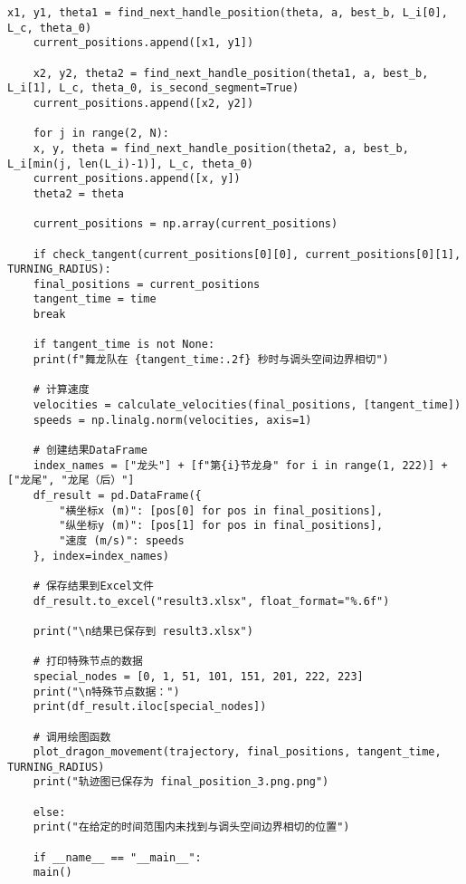 \begin{lstlisting}[caption={问题三处理代码1}]
	x1, y1, theta1 = find_next_handle_position(theta, a, best_b, L_i[0], L_c, theta_0)
	current_positions.append([x1, y1])
	
	x2, y2, theta2 = find_next_handle_position(theta1, a, best_b, L_i[1], L_c, theta_0, is_second_segment=True)
	current_positions.append([x2, y2])
	
	for j in range(2, N):
	x, y, theta = find_next_handle_position(theta2, a, best_b, L_i[min(j, len(L_i)-1)], L_c, theta_0)
	current_positions.append([x, y])
	theta2 = theta
	
	current_positions = np.array(current_positions)
	
	if check_tangent(current_positions[0][0], current_positions[0][1], TURNING_RADIUS):
	final_positions = current_positions
	tangent_time = time
	break
	
	if tangent_time is not None:
	print(f"舞龙队在 {tangent_time:.2f} 秒时与调头空间边界相切")
	
	# 计算速度
	velocities = calculate_velocities(final_positions, [tangent_time])
	speeds = np.linalg.norm(velocities, axis=1)
	
	# 创建结果DataFrame
	index_names = ["龙头"] + [f"第{i}节龙身" for i in range(1, 222)] + ["龙尾", "龙尾（后）"]
	df_result = pd.DataFrame({
		"横坐标x (m)": [pos[0] for pos in final_positions],
		"纵坐标y (m)": [pos[1] for pos in final_positions],
		"速度 (m/s)": speeds
	}, index=index_names)
	
	# 保存结果到Excel文件
	df_result.to_excel("result3.xlsx", float_format="%.6f")
	
	print("\n结果已保存到 result3.xlsx")
	
	# 打印特殊节点的数据
	special_nodes = [0, 1, 51, 101, 151, 201, 222, 223]
	print("\n特殊节点数据：")
	print(df_result.iloc[special_nodes])
	
	# 调用绘图函数
	plot_dragon_movement(trajectory, final_positions, tangent_time, TURNING_RADIUS)
	print("轨迹图已保存为 final_position_3.png.png")
	
	else:
	print("在给定的时间范围内未找到与调头空间边界相切的位置")
	
	if __name__ == "__main__":
	main()
	
\end{lstlisting}

